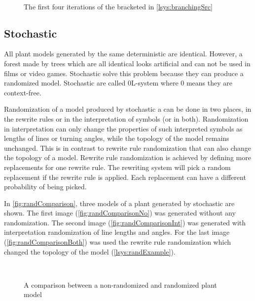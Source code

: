 \begin{figure}[h]
	\centering
	 ~
	 ~
	 ~
	\caption[The first four iterations of a bracketed \lsystem]{The first four iterations of the bracketed \lsystem in \autoref{lsys:branchingSrc}}
	\label{fig:branching}
\end{figure}



\subsection{Stochastic \lsystems}

\newcommand{\zerolsystem}{\mbox{0L-system}\xspace}
\newcommand{\zerolsystems}{\mbox{0L-systems}\xspace}

All plant models generated by the same deterministic \lsystem are identical.
However, a forest made by trees which are all identical looks artificial and can not be used in films or video games.
Stochastic \lsystems solve this problem because they can produce a randomized model.
Stochastic \lsystems are called \zerolsystem where 0 means they are context-free.

Randomization of a model produced by stochastic a \lsystem can be done in two places, in the rewrite rules or in the interpretation of symbols (or in both).
Randomization in interpretation can only change the properties of such interpreted symbols as lengths of lines or turning angles, while the topology of the model remains unchanged.
This is in contrast to rewrite rule randomization that can also change the topology of a model.
Rewrite rule randomization is achieved by defining more replacements for one rewrite rule.
The rewriting system will pick a random replacement if the rewrite rule is applied.
Each replacement can have a different probability of being picked.

In \autoref{fig:randComparison}, three models of a plant generated by stochastic \lsystems are shown.
The first image (\ref{fig:randComparisonNo}) was generated without any randomization.
The second image (\ref{fig:randComparisonInt}) was generated with interpretation randomization of line lengths and angles.
For the last image (\ref{fig:randComparisonBoth}) was used the rewrite rule randomization which changed the topology of the model (\autoref{lsys:randExample}).

\begin{figure}[h]
	\centering
	 ~
	 ~
	\caption{A comparison between a non-randomized and randomized plant model}
	\label{fig:randComparison}
\end{figure}

